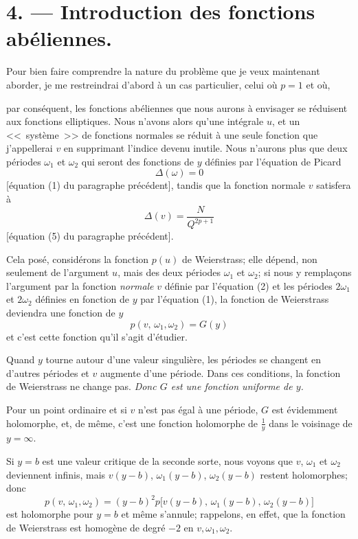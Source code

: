 \documentclass{article}
\begin{document}
\section*{4. --- Introduction des fonctions abéliennes.}

Pour bien faire comprendre la nature du problème que je veux maintenant aborder, je me restreindrai d'abord à un cas particulier, celui où $p = 1$ et où,

par conséquent, les fonctions abéliennes que nous aurons à envisager se réduisent aux fonctions elliptiques. Nous n'avons alors qu'une intégrale $u$, et un <<~système~>> de fonctions normales se réduit à une seule fonction que j'appellerai $v$ en supprimant l'indice devenu inutile. Nous n'aurons plus que deux périodes $\omega_{1}$ et $\omega_{2}$ qui seront des fonctions de $y$ définies par l'équation de Picard
\[
\Delta(\omega) = 0 \tag{1}
\]
[équation (1) du paragraphe précédent], tandis que la fonction normale $v$ satisfera à
\[
\Delta(v) = \frac{N}{Q^{2p+1}} \tag{2}
\]
[équation (5) du paragraphe précédent].

Cela posé, considérons la fonction $p(u)$ de Weierstrass; elle dépend, non seulement de l'argument $u$, mais des deux périodes $\omega_{1}$ et $\omega_{2}$; si nous y remplaçons l'argument par la fonction \emph{normale} $v$ définie par l'équation (2) et les périodes $2\omega_{1}$ et $2\omega_{2}$ définies en fonction de $y$ par l'équation (1), la fonction de Weierstrass deviendra une fonction de $y$
\[
p(v,\, \omega_{1}, \omega_{2}) = G(y)
\]
et c'est cette fonction qu'il s'agit d'étudier.

Quand $y$ tourne autour d'une valeur singulière, les périodes se changent en d'autres périodes et $v$ augmente d'une période. Dans ces conditions, la fonction de Weierstrass ne change pas. \emph{Donc $G$ est une fonction uniforme de $y$.}

Pour un point ordinaire et si $v$ n'est pas égal à une période, $G$ est évidemment holomorphe, et, de même, c'est une fonction holomorphe de $\frac{1}{y}$ dans le voisinage de $y = \infty$.

Si $y = b$ est une valeur critique de la seconde sorte, nous voyons que $v$, $\omega_{1}$ et $\omega_{2}$ deviennent infinis, mais $v(y - b)$, $\omega_{1}(y - b)$, $\omega_{2}(y - b)$ restent holomorphes; donc
\[
p(v,\, \omega_{1}, \omega_{2}) = (y - b)^{2} p\bigl[ v(y - b),\, \omega_{1}(y - b),\, \omega_{2}(y - b) \bigr]
\]
est holomorphe pour $y = b$ et même s'annule; rappelons, en effet, que la fonction de Weierstrass est homogène de degré $-2$ en $v, \omega_{1}, \omega_{2}$.
\end{document}

